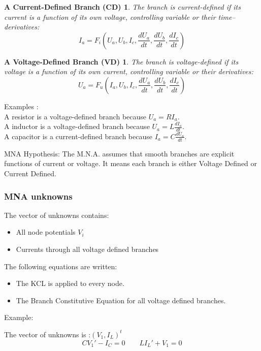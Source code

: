 \frame
{
\newtheorem{mur}{A Current-Defined Branch (CD)}
\begin{mur}
The branch is current-defined if its current is a function of its own voltage, controlling variable
or their time--derivatives:
\begin{equation}\label{CD}I_{a}=F_{i}(U_{a},U_{b},I_{c},\frac{dU_a}{dt},\frac{dU_b}{dt},\frac{dI_{c}}{dt})\end{equation}
\end{mur}
\newtheorem{mur_}{A Voltage-Defined Branch (VD)}
\begin{mur_}
The branch is voltage-defined if its voltage is a function of its own current, controlling variable
or their derivatives:
\begin{equation}\label{VD}U_{a}=F_{u}(I_{a},U_{b},I_{c},\frac{dU_a}{dt},\frac{dU_b}{dt},\frac{dI_{c}}{dt})\end{equation}
\end{mur_}
Examples : \\
A resistor is a voltage-defined branch because $U_{a}=RI_{a}$.\\
A inductor is a voltage-defined branch because $U_{a}=L\frac{dI_{a}}{dt}$.\\
A capacitor is a current-defined branch because $I_{a}=C\frac{dU_{a}}{dt}$.\\

 \begin{block}{MNA Hypothesis:}
The M.N.A. assumes that smooth branches are explicit functions of current or voltage. It means each
branch is either Voltage Defined or Current Defined.
  \end{block}
}
\frame
{
\frametitle{MNA unknowns}
 \begin{block}{The vector of unknowns contains:}
\begin{itemize}
\item All node potentials $V_{i}$
\item Currents through all voltage defined branches
\end{itemize}
\end{block}

 \begin{block}{The following equations are written:}
\begin{itemize}
\item The KCL is applied to every node.
\item The Branch Constitutive Equation for all voltage defined branches.
\end{itemize}
\end{block}
Example:
  \begin{figure}[h]
   \centerline{
   \scalebox{0.5}{
    
  }
 } 
 \end{figure}

The vector of unknowns is :$(V_{1},I_{L})^{t}$
\[CV_{1}'-I_{C}=0 \qquad LI_{L}'+V_{1}=0\]

}